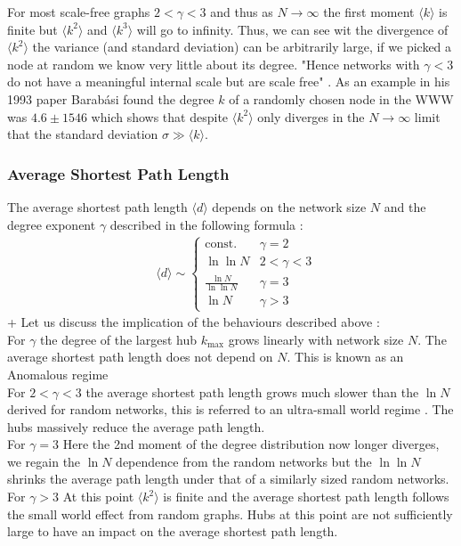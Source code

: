\documentclass{article}
\begin{document}
                For most scale-free graphs $2<\gamma<3$ and thus as $N\to \infty$ the first moment $\langle k \rangle$ is finite but $\langle k^2 \rangle$ and $\langle k^3 \rangle$ will go to infinity. Thus, we can see wit the divergence of $\langle k^2 \rangle$ the variance (and standard deviation) can be arbitrarily large, if we picked a node at random we know very little about its degree. "Hence networks with $\gamma<3$ do not have a meaningful internal scale but are scale free" \parencite{barabasi2013network}. As an example in his 1993 paper Barabási found the degree $k$ of a randomly chosen node in the WWW was $4.6 \pm 1546$ which shows that despite $\langle k^2 \rangle$ only diverges in the $N \to \infty$ limit that the standard deviation $\sigma \gg  \langle k \rangle$.\\
            \subsubsection{Average Shortest Path Length}
            The average shortest path length $\langle d \rangle$ depends on the network size $N$ and the degree exponent $\gamma$ described in the following formula \parencite{bollobas2004diameter}\parencite{cohen2003scale}:\\
            \begin{align*}
                &\langle d \rangle \sim
                \begin{cases}
                    \text{const.} &\gamma =2\\
                    \ln\ln N  &2<\gamma<3\\
                    \frac{\ln N}{\ln\ln N}  &\gamma = 3\\
                    \ln N  &\gamma>3
                \end{cases}
            \end{align*}+
            Let us discuss the implication of the behaviours described above \parencite{barabasi2013network}:\\
            For $\gamma$ the degree of the largest hub $k_{\text{max}}$ grows linearly with network size $N$. The average shortest path length does not depend on $N$. This is known as an Anomalous regime\\
            For $2<\gamma<3$ the average shortest path length grows much slower than the $\ln N$ derived for random networks, this is referred to an ultra-small world regime \parencite{cohen2003scale}. The hubs massively reduce the average path length.\\
            For $\gamma =3$ Here the 2nd moment of the degree distribution now longer diverges, we regain the $\ln N$ dependence from the random networks but the $\ln\ln N$ shrinks the average path length under that of a similarly sized random networks.\\
            For $\gamma > 3$ At this point $\langle k^2 \rangle$ is finite and the average shortest path length follows the small world effect from random graphs. Hubs at this point are not sufficiently large to have an impact on the average shortest path length.
\end{document}
